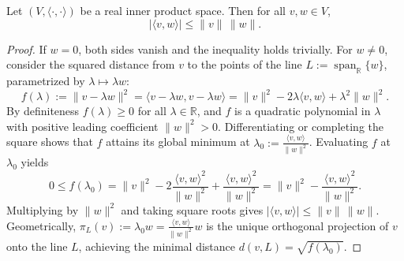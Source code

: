 \begin{remark}
\begin{center}
\end{center}
\end{remark}

\begin{proposition}
\label{prop:cauchy_schwarz_geometric_proof}
Let $(V, \langle\cdot,\cdot\rangle)$ be a real inner product space. Then for all $v, w \in V$,
\[
|\langle v, w\rangle| \leq \|v\|\,\|w\|.
\]
\end{proposition}

\begin{proof}
If $w = 0$, both sides vanish and the inequality holds trivially. For $w \neq 0$, consider the squared distance from $v$ to the points of the line $L := \operatorname{span}_{\mathbb{R}}\{w\}$, parametrized by $\lambda \mapsto \lambda w$:
\[
f(\lambda) := \|v - \lambda w\|^2 = \langle v - \lambda w, v - \lambda w\rangle = \|v\|^2 - 2\lambda\langle v, w\rangle + \lambda^2\|w\|^2.
\]
By definiteness $f(\lambda) \geq 0$ for all $\lambda \in \mathbb{R}$, and $f$ is a quadratic polynomial in $\lambda$ with positive leading coefficient $\|w\|^2 > 0$. Differentiating or completing the square shows that $f$ attains its global minimum at $\lambda_0 := \frac{\langle v, w\rangle}{\|w\|^2}$. Evaluating $f$ at $\lambda_0$ yields
\[
0 \leq f(\lambda_0) = \|v\|^2 - 2\frac{\langle v, w\rangle^2}{\|w\|^2} + \frac{\langle v, w\rangle^2}{\|w\|^2} = \|v\|^2 - \frac{\langle v, w\rangle^2}{\|w\|^2}.
\]
Multiplying by $\|w\|^2$ and taking square roots gives $|\langle v, w\rangle| \leq \|v\|\,\|w\|$. Geometrically, $\pi_L(v) := \lambda_0 w = \frac{\langle v, w\rangle}{\|w\|^2}w$ is the unique orthogonal projection of $v$ onto the line $L$, achieving the minimal distance $d(v, L) = \sqrt{f(\lambda_0)}$.
\end{proof}

